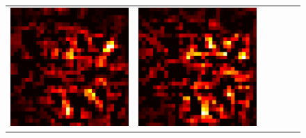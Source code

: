 \documentclass[preprint,12pt]{elsarticle}
\begin{document}
\begin{figure}[p]
\begin{tabular}{cccccc}
  \includegraphics[scale=\scale]{../visualizations/examples/cifar10/cnn/active_saliency_map/1.png} & 
  \includegraphics[scale=\scale]{../visualizations/examples/cifar10/cnn/inactive_saliency_map/1.png} \\
  

\end{tabular}
\end{figure}
\end{document}
